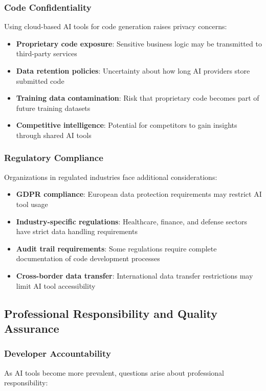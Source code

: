 \documentclass[conference]{IEEEtran}
\begin{document}
\subsubsection{Code Confidentiality}
Using cloud-based AI tools for code generation raises privacy concerns:

\begin{itemize}
    \item \textbf{Proprietary code exposure}: Sensitive business logic may be transmitted to third-party services
    \item \textbf{Data retention policies}: Uncertainty about how long AI providers store submitted code
    \item \textbf{Training data contamination}: Risk that proprietary code becomes part of future training datasets
    \item \textbf{Competitive intelligence}: Potential for competitors to gain insights through shared AI tools
\end{itemize}

\subsubsection{Regulatory Compliance}
Organizations in regulated industries face additional considerations:

\begin{itemize}
    \item \textbf{GDPR compliance}: European data protection requirements may restrict AI tool usage
    \item \textbf{Industry-specific regulations}: Healthcare, finance, and defense sectors have strict data handling requirements
    \item \textbf{Audit trail requirements}: Some regulations require complete documentation of code development processes
    \item \textbf{Cross-border data transfer}: International data transfer restrictions may limit AI tool accessibility
\end{itemize}

\subsection{Professional Responsibility and Quality Assurance}

\subsubsection{Developer Accountability}
As AI tools become more prevalent, questions arise about professional responsibility:
\end{document}
